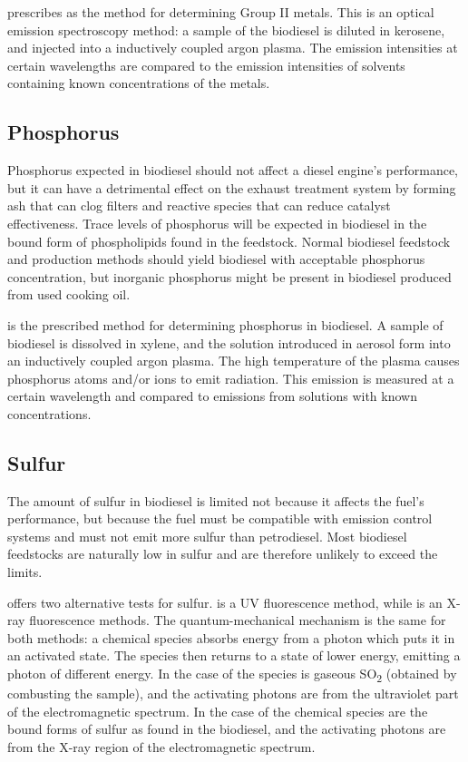  prescribes  as the method for determining Group II
metals. This is an optical emission spectroscopy method: a sample of the
biodiesel is diluted in kerosene, and injected into a inductively coupled argon
plasma. The emission intensities at certain wavelengths are compared to the
emission intensities of solvents containing known concentrations of the metals.

\subsection{Phosphorus}

Phosphorus expected in biodiesel should not affect a diesel engine's
performance, but it can have a detrimental effect on the exhaust treatment
system by forming ash that can clog filters and reactive species that can reduce
catalyst effectiveness. Trace levels of phosphorus will be expected in biodiesel
in the bound form of phospholipids found in the feedstock. Normal biodiesel
feedstock and production methods should yield biodiesel with acceptable
phosphorus concentration, but inorganic phosphorus might be present in biodiesel
produced from used cooking oil.
 
 is the prescribed method for determining phosphorus in
biodiesel. A sample of biodiesel is dissolved in xylene, and the solution
introduced in aerosol form into an inductively coupled argon plasma. The high
temperature of the plasma causes phosphorus atoms and/or ions to emit radiation.
This emission is measured at a certain wavelength and compared to emissions from
solutions with known concentrations.

\subsection{Sulfur}

The amount of sulfur in biodiesel is limited not because it affects the fuel's
performance, but because the fuel must be compatible with emission control
systems and must not emit more sulfur than petrodiesel. Most biodiesel
feedstocks are naturally low in sulfur and are therefore unlikely to exceed the
limits.

 offers two alternative tests for sulfur.  is a UV
fluorescence method, while  is an X-ray fluorescence methods. The
quantum-mechanical mechanism is the same for both methods: a chemical species
absorbs energy from a photon which puts it in an activated state. The species
then returns to a state of lower energy, emitting a photon of different energy.
In the case of  the species is gaseous SO\textsubscript{2}
(obtained by combusting the sample), and the activating photons are from the
ultraviolet part of the electromagnetic spectrum. In the case of 
the chemical species are the bound forms of sulfur as found in the biodiesel,
and the activating photons are from the X-ray region of the electromagnetic
spectrum.

